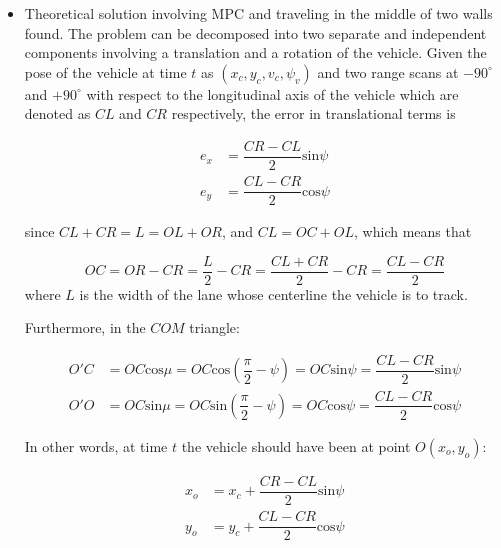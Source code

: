 \documentclass[oneside,12pt]{article}
\begin{document}
\begin{itemize}
  \item Theoretical solution involving MPC and traveling in the middle of two
    walls found. The problem can be decomposed into two separate and independent
    components involving a translation and a rotation of the vehicle. Given the
    pose of the vehicle at time $t$ as $(x_c, y_c, v_c, \psi_v)$ and two range
    scans at $-90^\circ$ and $+90^\circ$ with respect to the longitudinal axis of
    the vehicle which are denoted as $CL$ and $CR$ respectively, the error in
    translational terms is

    \begin{align}
      e_x &= \dfrac{CR-CL}{2}\text{sin}\psi \\
      e_y &= \dfrac{CL-CR}{2}\text{cos}\psi
    \end{align}

    since $CL + CR = L = OL + OR$, and $CL = OC + OL$, which means that

    \begin{equation}
      OC = OR - CR = \dfrac{L}{2} - CR = \dfrac{CL + CR}{2} - CR = \dfrac{CL-CR}{2}
    \end{equation}
    where $L$ is the width of the lane whose centerline the vehicle is to track.

    Furthermore, in the $COM$ triangle:

    \begin{align}
      O'C &= OC \text{cos}\mu = OC \text{cos}(\dfrac{\pi}{2} - \psi) = OC \text{sin}\psi = \dfrac{CL-CR}{2} \text{sin}\psi\\
      O'O &= OC \text{sin}\mu = OC \text{sin}(\dfrac{\pi}{2} - \psi) = OC \text{cos}\psi = \dfrac{CL-CR}{2} \text{cos}\psi
    \end{align}

    In other words, at time $t$ the vehicle should have been at point $O(x_o, y_o)$:

    \begin{align}
      x_o &=x_c + \dfrac{CR-CL}{2}\text{sin}\psi \\
      y_o &=y_c + \dfrac{CL-CR}{2}\text{cos}\psi
    \end{align}

    \begin{figure}[H]\centering
      \scalebox{1}{}
      \caption{}
      \label{}
    \end{figure}

    \begin{figure}[H]\centering
      \scalebox{1}{}
      \caption{}
      \label{}
    \end{figure}


\end{itemize}
\end{document}
